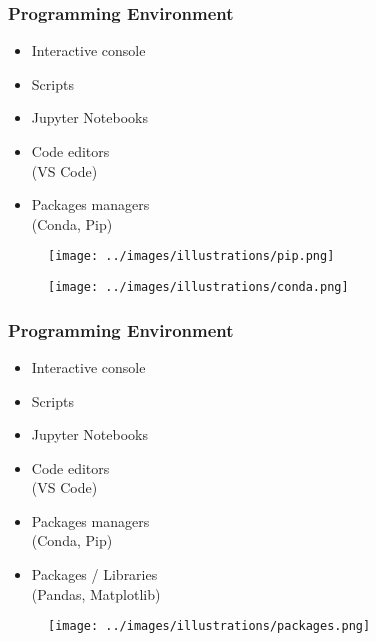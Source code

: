 \begin{frame}\frametitle{Programming Environment}

   \begin{minipage}{0.4\linewidth}
      \begin{itemize}
         \item Interactive console   
         \item Scripts
         \item Jupyter Notebooks
         \item Code editors\\(VS Code)
         \item Packages managers\\(Conda, Pip)
      \end{itemize}
   \end{minipage}
   \begin{minipage}{0.58\linewidth}
      \begin{figure}[H]
         \texttt{[image: ../images/illustrations/pip.png]}
      \end{figure}
      \begin{figure}[H]
         \texttt{[image: ../images/illustrations/conda.png]}
      \end{figure}
   \end{minipage}
\end{frame}



\begin{frame}\frametitle{Programming Environment}

   \begin{minipage}{0.4\linewidth}
      \begin{itemize}
         \item Interactive console   
         \item Scripts
         \item Jupyter Notebooks
         \item Code editors\\(VS Code)
         \item Packages managers\\(Conda, Pip)
         \item Packages / Libraries\\(Pandas, Matplotlib)
      \end{itemize}
   \end{minipage}
   \begin{minipage}{0.58\linewidth}
      \begin{figure}[H]
         \texttt{[image: ../images/illustrations/packages.png]}
      \end{figure}
   \end{minipage}
\end{frame}


